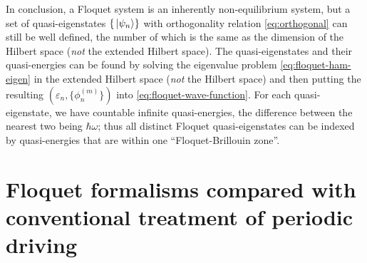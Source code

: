 \documentclass[hyperref, a4paper]{article}
\begin{document}
In conclusion, a Floquet system is an inherently non-equilibrium system,
but a set of quasi-eigenstates $\{ \ket*{\psi_n} \}$
with orthogonality relation \eqref{eq:orthogonal} can still be well defined,
the number of which is the same as 
the dimension of the Hilbert space 
(\emph{not} the extended Hilbert space).
The quasi-eigenstates and their quasi-energies can be found by solving 
the eigenvalue problem \eqref{eq:floquet-ham-eigen} in the extended Hilbert space
(\emph{not} the Hilbert space) 
and then putting the resulting $(\varepsilon_n, \{\phi_n^{(m)}\})$
into \eqref{eq:floquet-wave-function}.
For each quasi-eigenstate,
we have countable infinite quasi-energies,
the difference between the nearest two being $\hbar \omega$;
thus all distinct Floquet quasi-eigenstates can be indexed 
by quasi-energies that are within one ``Floquet-Brillouin zone''.

\section{Floquet formalisms compared with conventional treatment of periodic driving}
\end{document}
